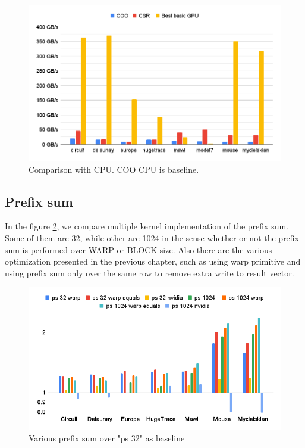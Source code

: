 \documentclass[conference]{IEEEtran}
\begin{document}
\begin{figure}[h!]
	\centering
	\includegraphics[width=0.9\linewidth]{data_images/cpu-vs-gpu}
	\caption{Comparison with CPU. COO CPU is baseline.}
	\label{fig:cpu-vs-gpu}
\end{figure}
\FloatBarrier

\subsection{Prefix sum}
In the figure \ref{fig:prefix-sum}, we compare multiple kernel implementation of the prefix sum. Some of them are 32, while other are 1024 in the sense whether or not the prefix sum is performed over WARP or BLOCK size. Also there are the various optimization presented in the previous chapter, such as using warp primitive and using prefix sum only over the same row to remove extra write to result vector.

\begin{figure}[h!]
	\centering
	\includegraphics[width=1\linewidth]{data_images/prefix-sum}
	\caption{Various prefix sum over "ps 32" as baseline}
	\label{fig:prefix-sum}
\end{figure}
\FloatBarrier
\end{document}
